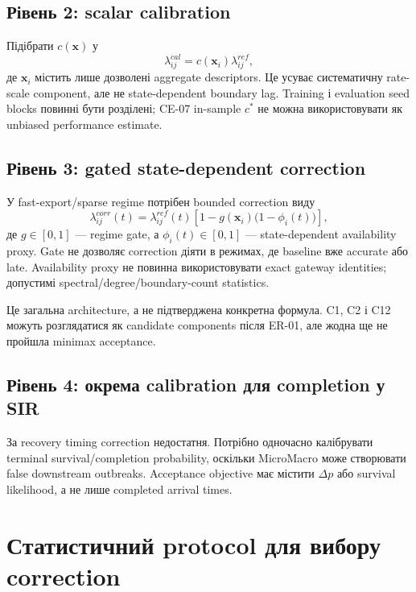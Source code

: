 \documentclass[11pt,a4paper]{article}
\begin{document}
\subsection{Рівень 2: scalar calibration}

Підібрати $c(\mathbf{x})$ у
\[
 \lambda^{cal}_{ij}=c(\mathbf{x}_i)\lambda^{ref}_{ij},
\]
де $\mathbf{x}_i$ містить лише дозволені aggregate descriptors. Це усуває
систематичну rate-scale component, але не state-dependent boundary lag.
Training і evaluation seed blocks повинні бути розділені; CE-07 in-sample
$c^*$ не можна використовувати як unbiased performance estimate.

\subsection{Рівень 3: gated state-dependent correction}

У fast-export/sparse regime потрібен bounded correction виду
\[
 \lambda^{corr}_{ij}(t)=\lambda^{ref}_{ij}(t)
 \left[1-g(\mathbf{x}_i)\bigl(1-\phi_i(t)\bigr)\right],
\]
де $g\in[0,1]$ --- regime gate, а $\phi_i(t)\in[0,1]$ --- state-dependent
availability proxy. Gate не дозволяє correction діяти в режимах, де baseline
вже accurate або late. Availability proxy не повинна використовувати exact
gateway identities; допустимі spectral/degree/boundary-count statistics.

Це загальна architecture, а не підтверджена конкретна формула. C1, C2 і C12
можуть розглядатися як candidate components після ER-01, але жодна ще не
пройшла minimax acceptance.

\subsection{Рівень 4: окрема calibration для completion у SIR}

За recovery timing correction недостатня. Потрібно одночасно калібрувати
terminal survival/completion probability, оскільки MicroMacro може створювати
false downstream outbreaks. Acceptance objective має містити $\Delta p$ або
survival likelihood, а не лише completed arrival times.

\section{Статистичний protocol для вибору correction}
\end{document}
